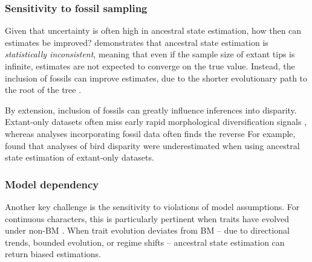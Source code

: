 \documentclass[titlepage]{article}
\begin{document}
\subsubsection{Sensitivity to fossil sampling}
Given that uncertainty is often high in ancestral state estimation, how then can estimates be improved?
\cite{ane2008analysis} demonstrates that ancestral state estimation is \textit{statistically inconsistent}, meaning that even if the sample size of extant tips is infinite, estimates are not expected to converge on the true value.
Instead, the inclusion of fossils can improve estimates, due to the shorter evolutionary path to the root of the tree \citep{finarelli2006ancestral,finarelli2013potential}.

By extension, inclusion of fossils can greatly influence inferences into disparity.
Extant-only datasets often miss early rapid morphological diversification signals \citep{harmon2010early}, whereas analyses incorporating fossil data often finds the reverse \citep{hughes2013clades}
For example,~\cite{mitchell2015extant} found that analyses of bird disparity were underestimated when using ancestral state estimation of extant-only datasets.





\subsubsection{Model dependency}
Another key challenge is the sensitivity to violations of model assumptions.
For continuous characters, this is particularly pertinent when traits have evolved under non-BM \citep{revell2025ancestral}.
When trait evolution deviates from BM -- due to directional trends, bounded evolution, or regime shifts -- ancestral state estimation can return biased estimations.
\end{document}
